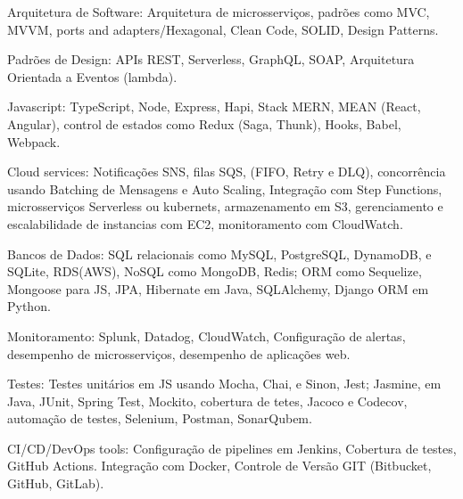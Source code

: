 \documentclass[a4paper,10pt]{article}
\begin{document}
\vspace{1.5mm} \textcolor{corSubSection}{Arquitetura de Software:}
Arquitetura de microsserviços, 
padrões como MVC, MVVM, ports and adapters/Hexagonal,
Clean Code, SOLID, Design Patterns.

\vspace{1.5mm}\textcolor{corSubSection}{Padrões de Design:}
APIs REST, Serverless, GraphQL, SOAP,
Arquitetura Orientada a Eventos (lambda).

\vspace{1.5mm}\textcolor{corSubSection}{Javascript:}
TypeScript, Node, Express, Hapi,
Stack MERN, MEAN (React, Angular),
control de estados como Redux (Saga, Thunk), Hooks,
Babel, Webpack.

\vspace{1.5mm}\textcolor{corSubSection}{Cloud services:}
Notificações SNS,
filas SQS, (FIFO, Retry e DLQ),
concorrência usando Batching de Mensagens e Auto Scaling,
Integração com Step Functions,
microsserviços Serverless ou kubernets,
armazenamento em S3,
gerenciamento e escalabilidade de instancias com EC2,
monitoramento com CloudWatch.

\vspace{1.5mm}\textcolor{corSubSection}{Bancos de Dados:}
SQL relacionais como
MySQL, PostgreSQL, DynamoDB, e SQLite, RDS(AWS),
NoSQL como
MongoDB, Redis;
ORM como
Sequelize, Mongoose para JS,
JPA, Hibernate em Java, SQLAlchemy,
Django ORM em Python.

\vspace{1.5mm}\textcolor{corSubSection}{Monitoramento:}
Splunk, Datadog, CloudWatch,
Configuração de alertas,
desempenho de microsserviços,
desempenho de aplicações web.

\vspace{1.5mm}\textcolor{corSubSection}{Testes:}
Testes unitários em JS usando Mocha,
Chai, e Sinon, Jest; Jasmine,
em Java, JUnit, Spring Test, Mockito,
cobertura de tetes, Jacoco e Codecov,
automação de testes, Selenium, Postman,
SonarQubem.


\vspace{1.5mm}\textcolor{corSubSection}{CI/CD/DevOps tools:}
Configuração de pipelines em Jenkins,
Cobertura de testes,
GitHub Actions.
Integração com Docker,
Controle de Versão GIT (Bitbucket, GitHub, GitLab).
\end{document}
